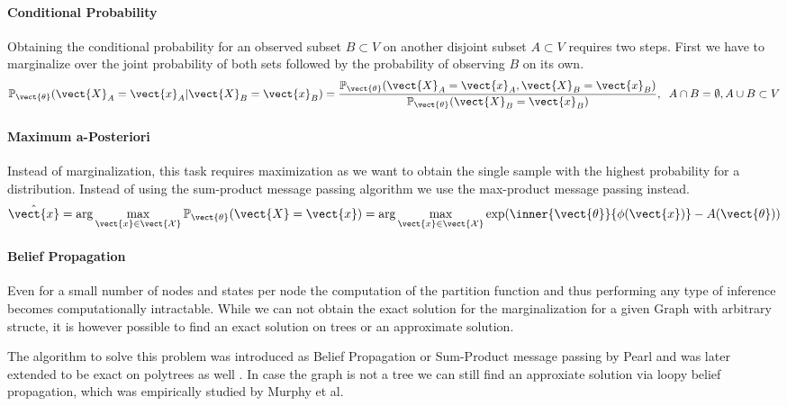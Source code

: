 \paragraph*{Conditional Probability}
Obtaining the conditional probability for an observed subset $B \subset V$ on another disjoint subset $A \subset V$ requires two steps. First we have to marginalize over the joint probability of both sets followed by the probability of observing $B$ on its own.
    \begin{equation}
        \mathbb{P}_{\vect{\theta}}(\vect{X}_A = \vect{x}_A \lvert \vect{X}_B = \vect{x}_B) = \frac{\mathbb{P}_{\vect{\theta}}(\vect{X}_A = \vect{x}_A , \vect{X}_B = \vect{x}_B)}{\mathbb{P}_{\vect{\theta}}(\vect{X}_B = \vect{x}_B)}, \;\; A \cap B = \emptyset, A \cup B \subset V
    \end{equation}

\paragraph*{Maximum a-Posteriori}
Instead of marginalization, this task requires maximization as we want to obtain the single sample with the highest probability for a distribution. 
Instead of using the sum-product message passing algorithm we use the max-product message passing instead.
\begin{equation}
    \hat{\vect{x}} = \arg\max_{\vect{x} \in \vect{\mathcal{X}}} \mathbb{P}_{\vect{\theta}}(\vect{X} = \vect{x}) = \arg\max_{\vect{x} \in \vect{\mathcal{X}}} \exp(\inner{\vect{\theta}}{\phi(\vect{x})} - A(\vect{\theta}))
\end{equation}

\paragraph*{Belief Propagation}
Even for a small number of nodes and states per node the computation of the partition function and thus performing any type of inference becomes computationally intractable.
While we can not obtain the exact solution for the marginalization for a given Graph with arbitrary structe, it is however possible to find an exact solution on trees or an approximate solution.

The algorithm to solve this problem was introduced as Belief Propagation or Sum-Product message passing by Pearl \cite{pearl1982reverend} and was later extended to be exact on polytrees as well \cite{kim1983computational}.
In case the graph is not a tree we can still find an approxiate solution via loopy belief propagation, which was empirically studied by Murphy et al. \cite{murphy2013loopy}

